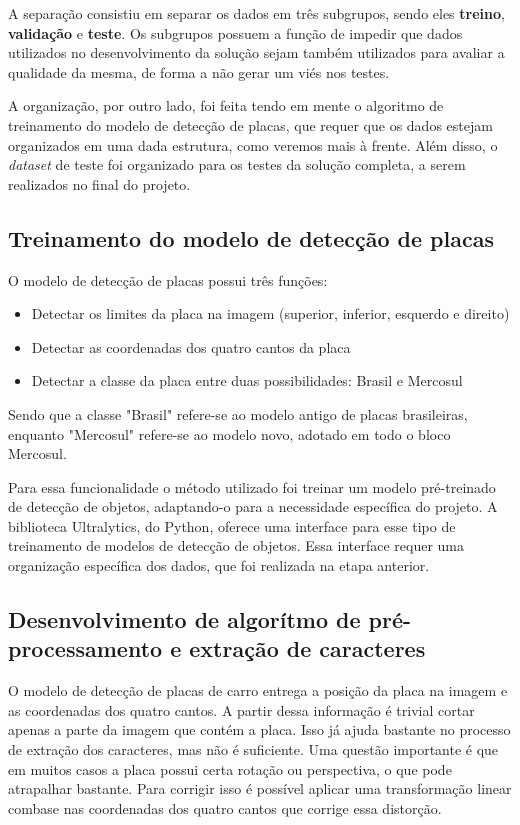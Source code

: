 A separação consistiu em separar os dados em três subgrupos, sendo eles \textbf{treino}, \textbf{validação} e \textbf{teste}. Os subgrupos possuem a função de impedir que dados utilizados no desenvolvimento da solução sejam também utilizados para avaliar a qualidade da mesma, de forma a não gerar um viés nos testes.

A organização, por outro lado, foi feita tendo em mente o algoritmo de treinamento do modelo de detecção de placas, que requer que os dados estejam organizados em uma dada estrutura, como veremos mais à frente. Além disso, o \textit{dataset} de teste foi organizado para os testes da solução completa, a serem realizados no final do projeto.

\subsection{Treinamento do modelo de detecção de placas}

O modelo de detecção de placas possui três funções:

\begin{itemize}
	\item Detectar os limites da placa na imagem (superior, inferior, esquerdo e direito)
	\item Detectar as coordenadas dos quatro cantos da placa
	\item Detectar a classe da placa entre duas possibilidades: Brasil e Mercosul
\end{itemize}

Sendo que a classe "Brasil" refere-se ao modelo antigo de placas brasileiras, enquanto "Mercosul" refere-se ao modelo novo, adotado em todo o bloco Mercosul.

Para essa funcionalidade o método utilizado foi treinar um modelo pré-treinado de detecção de objetos, adaptando-o para a necessidade específica do projeto. A biblioteca Ultralytics, do Python, oferece uma interface para esse tipo de treinamento de modelos de detecção de objetos. Essa interface requer uma organização específica dos dados, que foi realizada na etapa anterior.

\subsection{Desenvolvimento de algorítmo de pré-processamento e extração de caracteres}

O modelo de detecção de placas de carro entrega a posição da placa na imagem e as coordenadas dos quatro cantos. A partir dessa informação é trivial cortar apenas a parte da imagem que contém a placa. Isso já ajuda bastante no processo de extração dos caracteres, mas não é suficiente. Uma questão importante é que em muitos casos a placa possui certa rotação ou perspectiva, o que pode atrapalhar bastante. Para corrigir isso é possível aplicar uma transformação linear combase nas coordenadas dos quatro cantos que corrige essa distorção.

